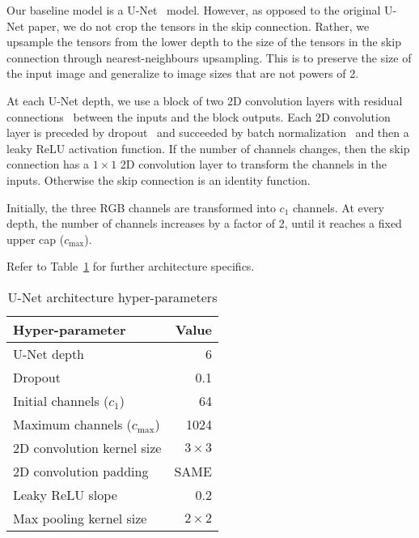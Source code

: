 Our baseline model is a U-Net~\cite{unet} model.
However, as opposed to the original U-Net paper, we do not crop the tensors in the skip connection.
Rather, we upsample the tensors from the lower depth to the size of the tensors in the skip connection through nearest-neighbours upsampling.
This is to preserve the size of the input image and generalize to image sizes that are not powers of 2.

At each U-Net depth, we use a block of two 2D convolution layers with residual connections~\cite{resnet} between the inputs and the block outputs.
Each 2D convolution layer is preceded by dropout~\cite{dropout} and succeeded by batch normalization~\cite{batch-norm} and then a leaky ReLU activation function.
If the number of channels changes, then the skip connection has a $1 \times 1$ 2D convolution layer to transform the channels in the inputs.
Otherwise the skip connection is an identity function.

Initially, the three RGB channels are transformed into $c_1$ channels.
At every depth, the number of channels increases by a factor of 2, until it reaches a fixed upper cap ($c_\mathrm{max}$).%

Refer to Table~\ref{tab:unet-hyper-params} for further architecture specifics.

\begin{table}[h]
    \centering
    \caption{U-Net architecture hyper-parameters}%
    \label{tab:unet-hyper-params}
    \begin{tabular}{l r}
        \toprule
        Hyper-parameter & Value \\
        \midrule
        U-Net depth & 6 \\
        Dropout & 0.1 \\
        Initial channels ($c_1$) & 64 \\
        Maximum channels ($c_\mathrm{max}$) & 1024 \\%
        2D convolution kernel size & $3 \times 3$ \\
        2D convolution padding & SAME \\
        Leaky ReLU slope & 0.2 \\
        Max pooling kernel size & $2 \times 2$ \\
        \bottomrule
    \end{tabular}
\end{table}
